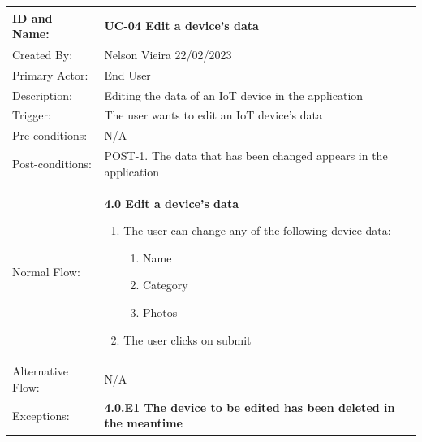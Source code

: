 \begin{table}[H]
    \centering
    \begin{adjustbox}{width=1.1\textwidth,center=\textwidth}
        \begin{tabular}{|m{4cm}|m{12cm}|}
            \hline
            ID and Name: & UC-04 Edit a device's data \\
            \hline
            Created By: & Nelson Vieira 22/02/2023 \\
            \hline
            Primary Actor: & End User \\
            \hline
            Description: & Editing the data of an IoT device in the application \\
            \hline
            Trigger: & The user wants to edit an IoT device's data \\
            \hline
            Pre-conditions: & N/A \\
            \hline
            Post-conditions: & POST-1. The data that has been changed appears in the application \\
            \hline
            Normal Flow: & \textbf{4.0 Edit a device's data}
            \begin{enumerate}
                \item The user can change any of the following device data:
                \begin{enumerate}
                    \item Name
                    \item Category
                    \item Photos
                \end{enumerate}
                \item The user clicks on submit
            \end{enumerate} \\
            \hline
            Alternative Flow: & N/A \\
            \hline
            Exceptions: &
            \textbf{4.0.E1  The device to be edited has been deleted in the meantime}

\end{tabular}
\end{adjustbox}
\end{table}
